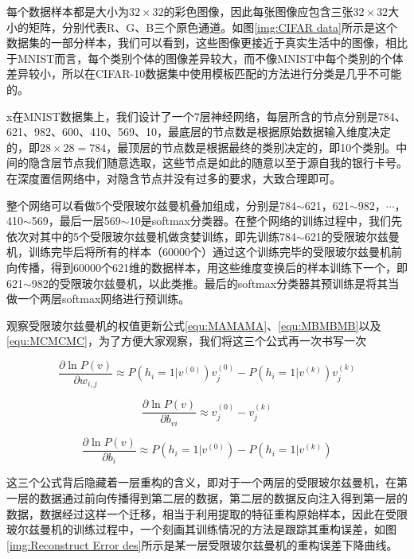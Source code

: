 每个数据样本都是大小为$32\times 32$的彩色图像，因此每张图像应包含三张$32\times 32$大小的矩阵，分别代表R、G、B三个原色通道。如图\ref{img:CIFAR data}所示是这个数据集的一部分样本，我们可以看到，这些图像更接近于真实生活中的图像，相比于MNIST而言，每个类别个体的图像差异较大，而不像MNIST中每个类别的个体差异较小，所以在CIFAR-10数据集中使用模板匹配的方法进行分类是几乎不可能的。

x在MNIST数据集上，我们设计了一个7层神经网络，每层所含的节点分别是784、621、982、600、410、569、10，最底层的节点数是根据原始数据输入维度决定的，即$28\times 28 = 784$，最顶层的节点数是根据最终的类别决定的，即10个类别。中间的隐含层节点我们随意选取，这些节点是如此的随意以至于源自我的银行卡号。在深度置信网络中，对隐含节点并没有过多的要求，大致合理即可。

整个网络可以看做5个受限玻尔兹曼机叠加组成，分别是784$\sim$621，621$\sim$982，$\cdots$，410$\sim$569，最后一层569$\sim$10是softmax分类器。在整个网络的训练过程中，我们先依次对其中的5个受限玻尔兹曼机做贪婪训练，即先训练784$\sim$621的受限玻尔兹曼机，训练完毕后将所有的样本（60000个）通过这个训练完毕的受限玻尔兹曼机前向传播，得到60000个621维的数据样本，用这些维度变换后的样本训练下一个，即621$\sim$982的受限玻尔兹曼机，以此类推。最后的softmax分类器其预训练是将其当做一个两层softmax网络进行预训练。

观察受限玻尔兹曼机的权值更新公式\eqref{equ:MAMAMA}、\eqref{equ:MBMBMB}以及\eqref{equ:MCMCMC}，为了方便大家观察，我们将这三个公式再一次书写一次

\begin{equation}
\frac{\partial\ln P(v)}{\partial w_{i, j}} \approx
 P(h_i = 1 | v^{(0)})v_j^{(0)} - P(h_i = 1 | v^{(k)})v_j^{(k)}
\end{equation}

\begin{equation}
\frac{\partial\ln P(v)}{\partial b_{vi}} \approx
v_j^{(0)} - v_j^{(k)}
\end{equation}

\begin{equation}
\frac{\partial\ln P(v)}{\partial b_{i}} \approx
 P(h_i = 1 | v^{(0)}) - P(h_i = 1 | v^{(k)})
\end{equation}

这三个公式背后隐藏着一层重构的含义，即对于一个两层的受限玻尔兹曼机，在第一层的数据通过前向传播得到第二层的数据，第二层的数据反向注入得到第一层的数据，数据经过这样一个迁移，相当于利用提取的特征重构原始样本，因此在受限玻尔兹曼机的训练过程中，一个刻画其训练情况的方法是跟踪其重构误差，如图\ref{img:Reconstruct Error des}所示是某一层受限玻尔兹曼机的重构误差下降曲线。

